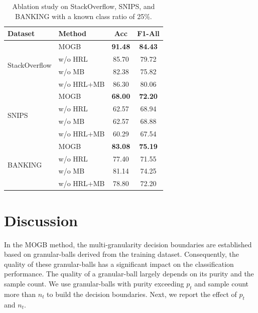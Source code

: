 \documentclass[letterpaper]{article} %
\theoremstyle{definition}
\begin{document}
\begin{table}[t]
\centering
\begin{tabular}{l l c c}
\toprule
Dataset & Method       & Acc & F1-All \\
\midrule
\multirow{4}{*}{StackOverflow} 
    & MOGB        & \textbf{91.48}  & \textbf{84.43} \\
    & w/o HRL      & 85.70           & 79.72          \\
    & w/o MB       & 82.38           & 75.82          \\
    & w/o HRL+MB   & 86.30           & 80.06          \\
\midrule
\multirow{4}{*}{SNIPS} 
    & MOGB              & \textbf{68.00}         & \textbf{72.20} \\
    & w/o HRL      & 62.57           & 68.94          \\
    & w/o MB       & 62.57           & 68.88          \\
    & w/o HRL+MB   & 60.29           & 67.54          \\
\midrule
\multirow{4}{*}{BANKING} 
    & MOGB              & \textbf{83.08}  & \textbf{75.19} \\
    & w/o HRL      & 77.40           & 71.55          \\
    & w/o MB       & 81.14           & 74.25          \\
    & w/o HRL+MB   & 78.80           & 72.20          \\
\bottomrule
\end{tabular}
\caption{Ablation study on StackOverflow, SNIPS, and BANKING with a known class ratio of 25\%.}
\label{tab:3}
\end{table}



\section{Discussion}\label{sec:6}

In the MOGB method, the multi-granularity decision boundaries are established based on granular-balls derived from the training dataset. Consequently, the quality of these granular-balls has a significant impact on the classification performance. The quality of a granular-ball largely depends on its purity and the sample count. We use granular-balls with purity exceeding $p_t$ and sample count more than $n_t$ to build the decision boundaries. Next, we report the effect of $p_t$ and $n_t$.
\end{document}
